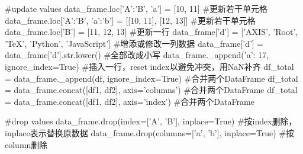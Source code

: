 \begin{codeblock}[language=python, caption={Basic functions about DataFrame}]
        #update values
        data_frame.loc['A':'B', 'a'] = [10, 11] #更新若干单元格
        data_frame.loc['A':'B', 'a':'b'] = [[10, 11], [12, 13]] #更新若干单元格
        data_frame.loc['B'] = [11, 12, 13] #更新一行
        data_frame['d'] = ['AXIS', 'Root', 'TeX', 'Python', 'JavaScript'] #增添或修改一列数据
        data_frame['d'] = data_frame['d'].str.lower() #全部改成小写
        data_frame._append({'a': 17}, ignore_index=True) #插入一行，reset index以避免冲突，用NaN补齐
        df_total = data_frame._append(df, ignore_index=True) #合并两个DataFrame
        df_total = data_frame.concat([df1, df2], axis='columns') #合并两个DataFrame
        df_total = data_frame.concat([df1, df2], axis='index') #合并两个DataFrame

        #drop values
        data_frame.drop(index=['A', 'B'], inplace=True) #按index删除，inplace表示替换原数据
        data_frame.drop(columns=['a', 'b'], inplace=True) #按column删除
      \end{codeblock}

